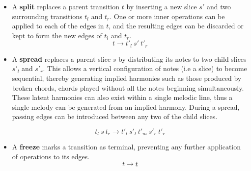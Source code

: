 \documentclass[12pt,a4paper,twoside,openany]{report} \usepackage[pdfborder={0 0 0}]{hyperref}    %
\theoremstyle{definition} \newtheorem{definition}{Definition}[section]
\begin{document}
    \begin{itemize} \item A \textbf{split} replaces a parent transition $t$ by inserting a new slice $s'$ and two
      surrounding transitions $t_l$ and $t_r$. One or more inner operations can be applied to each of the edges in
      $t$, and the resulting edges can be discarded or kept to form the new edges of $t_l$ and $t_r$. 
      \begin{equation} t \to t'_l~s'~t'_r \label{eq:splitrule} \end{equation} 
      \item A \textbf{spread}
      replaces a parent slice $s$ by distributing its notes to two child slices $s'_l$ and $s'_r$. 
      This allows a vertical configuration of notes (i.e a slice) to become sequential, thereby generating implied
      harmonies such as those produced by broken chords, chords played without all the notes beginning simultaneously. These latent harmonies can also exist within a single melodic
      line, thus a single melody can be generated from an implied harmony. During a spread, passing edges can be
      introduced between any two of the child slices. 

      \begin{equation} t_l~s~t_r \to t'_l~s'_l~t'_m~s'_r~t'_r \label{eq:spreadrule} \end{equation} 
      \item A \textbf{freeze} marks a transition as terminal, preventing any further application of operations to its edges. 
  \begin{equation} t \to \underline{t} \label{eq:freezerule} \end{equation} 
\end{itemize}
\end{document}

